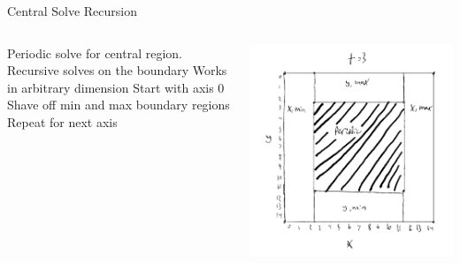 \begin{frame}{Central Solve Recursion}
  \begin{columns}
  \begin{outline}
  \1 Periodic solve for central region.
  \1 Recursive solves on the boundary
  \1 Works in arbitrary dimension
  \2 Start with axis 0
  \2 Shave off min and max boundary regions
  \2 Repeat for next axis
  \end{outline}

  \begin{center}
  \centering
  \includegraphics[width=\textwidth]{decomp_2d.png}
  \end{center}
\end{columns}
\end{frame}

